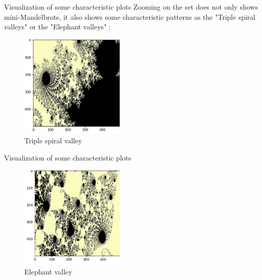 \documentclass [xcolor=svgnames, t] {beamer}
\begin{document}
\begin{frame}{Visualization of some characteristic plots}
    Zooming on the set does not only shows mini-Mandelbrots, it also shows some characteristic patterns as the "Triple spiral valleys" or the "Elephant valleys" : 
    \begin{figure}[!h]
    \begin{center}
   \caption{\label{étiquette} Triple spiral valley}
   \includegraphics[width=5cm]{Triple_spiral_valley.png}
   \end{center}
    \end{figure}
\end{frame}

\begin{frame}{Visualization of some characteristic plots}
	\begin{figure}[!h]
    \begin{center}
   \caption{\label{étiquette} Elephant valley}
   \includegraphics[width=5cm]{Elephant_valley.png}
   \end{center}
    \end{figure}
\end{frame}
\end{document}
